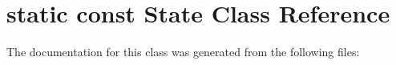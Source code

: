 \hypertarget{classstatic_01const_01State}{}\section{static const State Class Reference}
\label{classstatic_01const_01State}


The documentation for this class was generated from the following files\+: